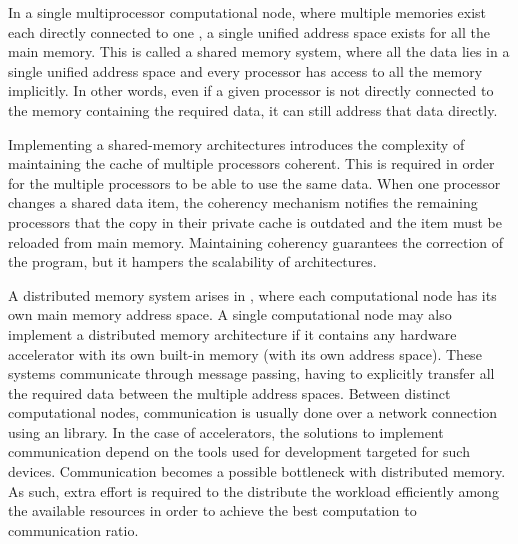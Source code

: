 \documentclass[../thesis]{subfiles}
\begin{document}
		In a single multiprocessor computational node, where multiple memories exist each directly connected to one \cpu, a single unified address space exists for all the main memory. This is called a shared memory system, where all the data lies in a single unified address space and every processor has access to all the memory implicitly. In other words, even if a given processor is not directly connected to the memory containing the required data, it can still address that data directly.

		Implementing a shared-memory \numa architectures introduces the complexity of maintaining the cache of multiple processors coherent. This is required in order for the multiple processors to be able to use the same data. When one processor changes a shared data item, the coherency mechanism notifies the remaining processors that the copy in their private cache is outdated and the item must be reloaded from main memory. Maintaining coherency guarantees the correction of the program, but it hampers the scalability of \numa architectures.

		A distributed memory system arises in \hetplats, where each computational node has its own main memory address space. A single computational node may also implement a distributed memory architecture if it contains any hardware accelerator with its own built-in memory (with its own address space). These systems communicate through message passing, having to explicitly transfer all the required data between the multiple address spaces. Between distinct computational nodes, communication is usually done over a network connection using an \mpi library. In the case of accelerators, the solutions to implement communication depend on the tools used for development targeted for such devices. Communication becomes a possible bottleneck with distributed memory. As such, extra effort is required to the distribute the workload efficiently among the available resources in order to achieve the best computation to communication ratio.

		
	
\end{document}
